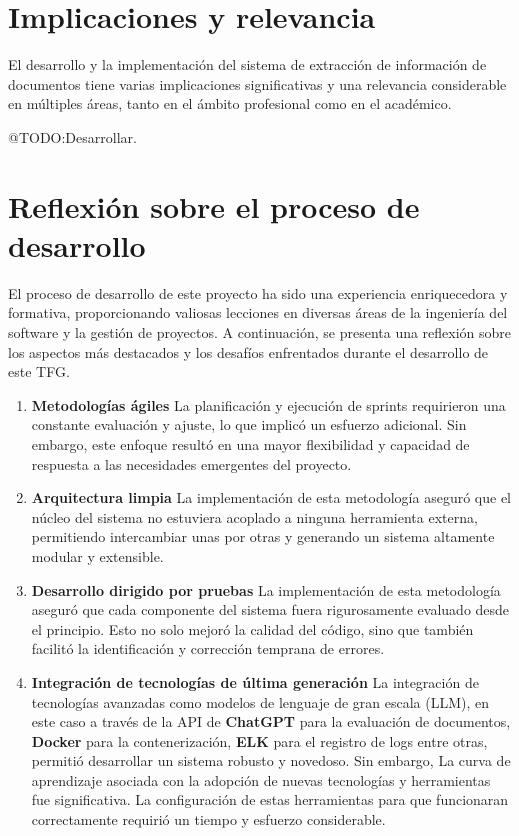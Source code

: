 \section{Implicaciones y relevancia}

El desarrollo y la implementación del sistema de extracción de información de documentos tiene varias implicaciones
significativas y una relevancia considerable en múltiples áreas, tanto en el ámbito profesional como en el académico.


\colorbox{color_highlight}{@TODO:Desarrollar.}


\section{Reflexión sobre el proceso de desarrollo}

El proceso de desarrollo de este proyecto ha sido una experiencia enriquecedora y formativa, proporcionando valiosas
lecciones en diversas áreas de la ingeniería del software y la gestión de proyectos.
A continuación, se presenta una reflexión sobre los aspectos más destacados y los desafíos enfrentados durante el
desarrollo de este TFG.

\begin{enumerate}
    \item \textbf{Metodologías ágiles}
    La planificación y ejecución de sprints requirieron una constante evaluación y ajuste, lo que implicó un esfuerzo
    adicional.
    Sin embargo, este enfoque resultó en una mayor flexibilidad y capacidad de respuesta a las necesidades emergentes
    del proyecto.
    \item \textbf{Arquitectura limpia}
    La implementación de esta metodología aseguró que el núcleo del sistema no estuviera acoplado a ninguna
    herramienta externa, permitiendo intercambiar unas por otras y generando un sistema altamente modular y extensible.
    \item \textbf{Desarrollo dirigido por pruebas}
    La implementación de esta metodología aseguró que cada componente del sistema fuera rigurosamente evaluado desde el
    principio.
    Esto no solo mejoró la calidad del código, sino que también facilitó la identificación y corrección temprana de
    errores.
    \item \textbf{Integración de tecnologías de última generación}
    La integración de tecnologías avanzadas como modelos de lenguaje de gran escala (LLM), en este caso a través de
    la API de \textbf{ChatGPT} para la evaluación de documentos, \textbf{Docker} para la contenerización, \textbf{ELK}
    para el registro de logs entre otras, permitió desarrollar un sistema robusto y novedoso.
    Sin embargo, La curva de aprendizaje asociada con la adopción de nuevas tecnologías y herramientas fue
    significativa.
    La configuración de estas herramientas para que funcionaran correctamente requirió un tiempo y esfuerzo
    considerable.
\end{enumerate}

